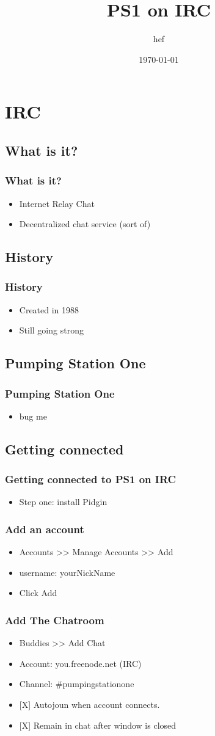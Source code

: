 \documentclass[hyperref={pdfpagelabels=false}]{beamer}
\title{PS1 on IRC}
\author{hef}
\date{\today}
\begin{document}
\frame{\titlepage}
\section[outline]{}
\frame{\tableofcontents}
\section{IRC}
	\subsection{What is it?}
		\frame
		{
			\frametitle{What is it?}
			\begin{itemize}
				\item{Internet Relay Chat}
				\item{Decentralized chat service (sort of)}
			\end{itemize}
		}

	\subsection{History}
		\frame
		{
			\frametitle{History}
			\begin{itemize}
				\item{Created in 1988}
				\item{Still going strong}
			\end{itemize}
		}
	\subsection{Pumping Station One}
		\frame
		{
			\frametitle{Pumping Station One}
			\begin{itemize}
				\item{bug me}
			\end{itemize}
		}
	\subsection{Getting connected}
		\frame
		{
			\frametitle{Getting connected to PS1 on IRC}
			\begin{itemize}
				\item{Step one: install Pidgin}
			\end{itemize}
		}
		\frame
		{
			\frametitle{Add an account}
			\begin{itemize}
				\item{Accounts >> Manage Accounts >> Add}
				\item{username: yourNickName}
				\item{Click Add}
			\end{itemize}
		}
		\frame
		{
			\frametitle{Add The Chatroom}
			\begin{itemize}
				\item{Buddies >> Add Chat}
				\item{Account: you\@irc.freenode.net (IRC)}
				\item{Channel: \#pumpingstationone}
				\item{[X] Autojoun when account connects.}
				\item{[X] Remain in chat after window is closed}
			\end{itemize}
		}
\end{document}
